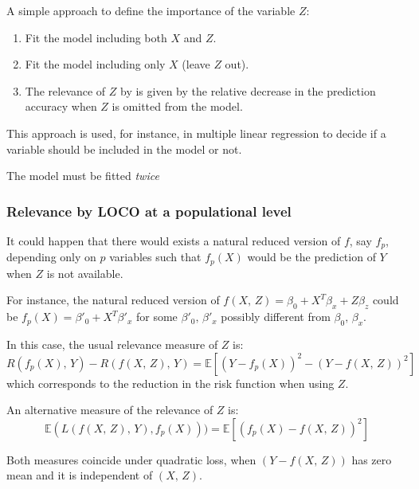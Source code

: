 A simple approach to define the importance of the variable $Z$:
\begin{enumerate}
	\item Fit the model including both $X$ and $Z$.
	\item Fit the model including only $X$ (leave $Z$ out).
	\item The relevance of $Z$ by  is given by the relative
	      decrease in the prediction accuracy when $Z$ is omitted from the model.
\end{enumerate}

This approach is used, for instance, in multiple linear regression
to decide if a variable should be included in the model or not.

\begin{note}
	The model must be fitted \emph{twice}
\end{note}

\subsubsection{Relevance by LOCO at a populational level}

It could happen that there would exists a natural reduced version of
$f$, say $f_p$, depending only on $p$ variables such that $f_p(X)$ would be the prediction
of $Y$ when $Z$ is not available.

For instance, the natural reduced version of $f(X,\,Z) = \beta_0 + X^T\beta_x + Z\beta_z$
could be $f_p(X) = \beta'_0 + X^T\beta'_x$ for some $\beta'_0,\,\beta'_x$ possibly
different from $\beta_0,\,\beta_x$.

In this case, the usual relevance measure of $Z$ is:
\begin{equation*}
	R(f_p(X),\,Y) - R(f(X,\,Z),\,Y) = \mathds{E} \left[ (Y - f_p(X))^2 - (Y - f(X,\,Z))^2 \right]
\end{equation*}
which corresponds to the reduction in the risk function when using $Z$.

An alternative measure of the relevance of $Z$ is:
\begin{equation*}
	\mathds{E}(L(f(X,\,Z),\,Y),f_p(X))) = \mathds{E} \left[ (f_p(X) - f(X,\,Z))^2 \right]
\end{equation*}

Both measures coincide under quadratic loss, when $(Y - f(X,\,Z))$ has zero mean
and it is independent of $(X,\,Z)$.

